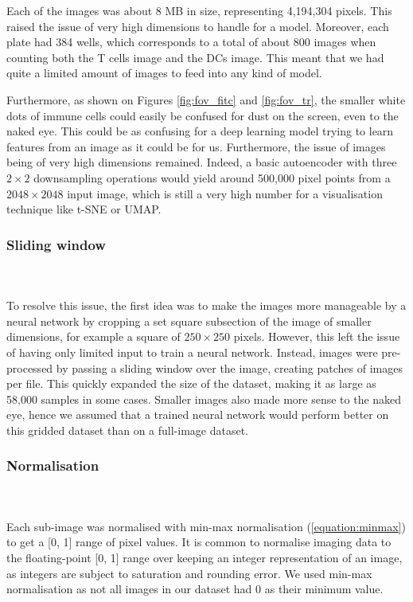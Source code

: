 Each of the images was about 8 MB in size, representing 4,194,304 pixels. This raised the issue of very high dimensions to handle for a model. Moreover, each plate had 384 wells, which corresponds to a total of about 800 images when counting both the T cells image and the DCs image. This meant that we had quite a limited amount of images to feed into any kind of model. 

Furthermore, as shown on Figures \ref{fig:fov_fitc} and \ref{fig:fov_tr}, the smaller white dots of immune cells could easily be confused for dust on the screen, even to the naked eye. This could be as confusing for a deep learning model trying to learn features from an image as it could be for us. Furthermore, the issue of images being of very high dimensions remained. Indeed, a basic autoencoder with three $2\times2$ downsampling operations would yield around 500,000 pixel points from a $2048\times2048$ input image, which is still a very high number for a visualisation technique like t-SNE or UMAP. 

\bigskip
\subsubsection{Sliding window}    

\hfill\\
\hfill\\
To resolve this issue, the first idea was to make the images more manageable by a neural network by cropping a set square subsection of the image of smaller dimensions, for example a square of $250\times250$ pixels. However, this left the issue of having only limited input to train a neural network. Instead, images were pre-processed by passing a sliding window over the image, creating patches of images per file. This quickly expanded the size of the dataset, making it as large as 58,000 samples in some cases. Smaller images also made more sense to the naked eye, hence we assumed that a trained neural network would perform better on this gridded dataset than on a full-image dataset. 

\bigskip
\subsubsection{Normalisation}

\hfill\\
\hfill\\
Each sub-image was normalised with min-max normalisation (\autoref{equation:minmax}) to get a [0, 1] range of pixel values. It is common to normalise imaging data to the floating-point [0, 1] range over keeping an integer representation of an image, as integers are subject to saturation and rounding error. We used min-max normalisation as not all images in our dataset had 0 as their minimum value.  

